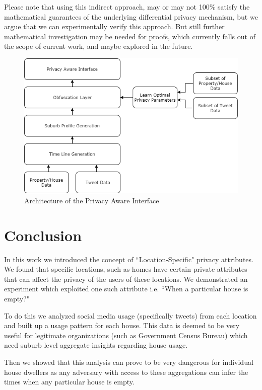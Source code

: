 \documentclass[12pt]{report}
\theoremstyle{named}
\begin{document}
Please note that using this indirect approach, may or may not 100\% satisfy the mathematical guarantees of the underlying differential privacy mechanism, but we argue that we can experimentally verify this approach. But still further mathematical investigation may be needed for proofs, which currently falls out of the scope of current work, and maybe explored in the future.


\begin{figure}[ht]
\centering
        \includegraphics[width=120mm,scale=1]{Images/ObfuscatedInterface.png}
    \caption{Architecture of the Privacy Aware Interface}
    \label{fig:ObfuscatedInterface}
\end{figure}

\chapter{Conclusion}
In this work we introduced the concept of ``Location-Specific" privacy attributes. We found that specific locations, such as homes have certain private attributes that can affect the privacy of the users of these locations. We demonstrated an experiment which exploited one such attribute i.e. ``When a particular house is empty?"

To do this we analyzed social media usage (specifically tweets) from each location and built up a usage pattern for each house. This data is deemed to be very useful for legitimate organizations (such as Government Census Bureau) which need suburb level aggregate insights regarding house usage.

Then we showed that this analysis can prove to be very dangerous for individual house dwellers as any adversary with access to these aggregations can infer the times when any particular house is empty.
\end{document}
